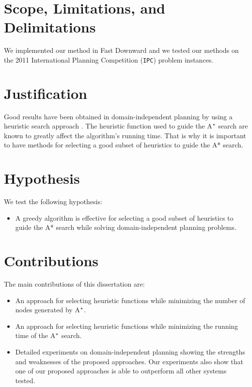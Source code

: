 \section{Scope, Limitations, and Delimitations}
\noindent
We implemented our method in Fast Downward \cite{helmert2006fast} and we tested our methods on the 2011 International Planning Competition (\texttt{IPC}) problem instances.

\section{Justification}
\noindent
Good results have been obtained in domain-independent planning by using a heuristic search approach \cite{bonet2001planning}. The heuristic function used to guide the A$\sp{*}$ search are known to greatly affect the algorithm's running time. That is why it is important to have methods for selecting a good subset of heuristics to guide the A* search.


\section{Hypothesis}
\noindent
We test the following hypothesis:
\begin{itemize}
\item A greedy algorithm is effective for selecting a good subset of heuristics to guide the A* search while solving domain-independent planning problems.
\end{itemize}

\section{Contributions}
\noindent
The main contributions of this dissertation are:
\begin{itemize}
\item An approach for selecting heuristic functions while minimizing the number of nodes generated by A$\sp{*}$.

\item An approach for selecting heuristic functions while minimizing the running time of the A$\sp{*}$ search. 

\item Detailed experiments on domain-independent planning showing the strengths and weaknesses of the proposed approaches. Our experiments also show that one of our proposed approaches is able to outperform all other systems tested. 

\end{itemize}


